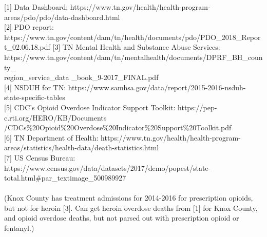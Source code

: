 \documentclass[12pt]{article}
\begin{document}
{[1]} Data Dashboard: https://www.tn.gov/health/health-program-areas/pdo/pdo/data-dashboard.html
\\
{[2]} PDO report: \\
https://www.tn.gov/content/dam/tn/health/documents/pdo/PDO\_2018\_Report\_02.06.18.pdf
{[3]} TN Mental Health and Substance Abuse Services: \\
 https://www.tn.gov/content/dam/tn/mentalhealth/documents/DPRF\_BH\_county\_ \\
 region\_service\_data \_book\_9-2017\_FINAL.pdf \\
{[4]} NSDUH for TN: https://www.samhsa.gov/data/report/2015-2016-nsduh-state-specific-tables \\
{[5]} CDC's Opioid Overdose Indicator Support Toolkit: https://pep-c.rti.org/HERO/KB/Documents\\/CDCs\%20Opioid\%20Overdose\%20Indicator\%20Support\%20Toolkit.pdf \\
{[6]} TN Department of Health: https://www.tn.gov/health/health-program-areas/statistics/health-data/death-statistics.html \\
{[7]} US Census Bureau:  https://www.census.gov/data/datasets/2017/demo/popest/state-total.html{\#}par{\_}textimage{\_}500989927
\\ \\

(Knox County has treatment admissions for 2014-2016 for prescription opioids, but not for heroin [3]. Can get heroin overdose deaths from [1] for Knox County, and opioid overdose deaths, but not parsed out with prescription opioid or fentanyl.) 











 
\end{document}
